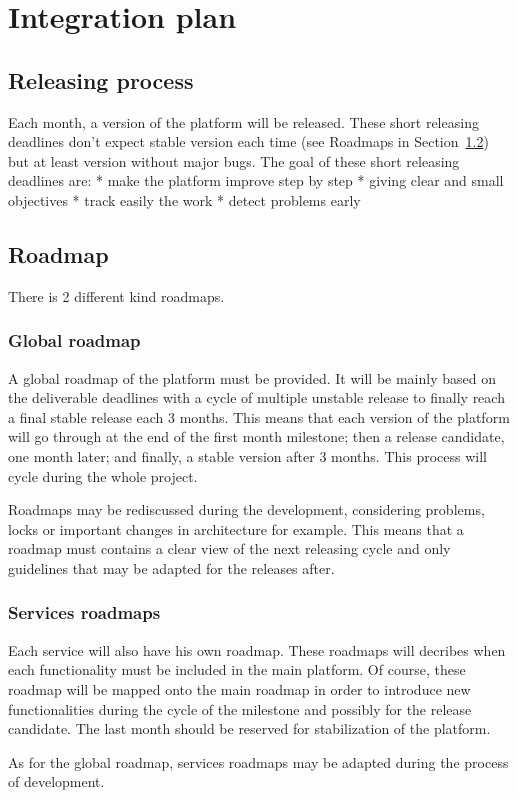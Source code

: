 \chapter{Integration plan}
\label{ch:integration-plan}

\section{Releasing process}
\label{sec:releasing-process}

Each month, a version of the platform will be released.
These short releasing deadlines don't expect stable version each time (see Roadmaps in
Section~\ref{sec:roadmap}) but at least version without major bugs.
The goal of these short releasing deadlines are:
* make the platform improve step by step
* giving clear and small objectives
* track easily the work
* detect problems early

\section{Roadmap}
\label{sec:roadmap}

There is 2 different kind roadmaps.
\subsection{Global roadmap}
\label{sec:global-roadmap}

A global roadmap of the platform must be provided.
It will be mainly based on the deliverable deadlines with a cycle of multiple unstable release to
finally reach a final stable release each 3 months.
This means that each version of the \learnpad platform will go through at the end of the first
month milestone; then a release candidate, one month later; and finally, a stable version after
3 months.
This process will cycle during the whole project.

Roadmaps may be rediscussed during the development, considering problems, locks or important
changes in architecture for example.
This means that a roadmap must contains a clear view of the next releasing cycle and only
guidelines that may be adapted for the releases after.

\subsection{Services roadmaps}
\label{sec:services-roadmaps}

Each service will also have his own roadmap.
These roadmaps will decribes when each functionality must be included in the main \learnpad
platform. Of course, these roadmap will be mapped onto the main roadmap in order to introduce new
functionalities during the cycle of the milestone and possibly for the release candidate.
The last month should be reserved for stabilization of the platform.

As for the global roadmap, services roadmaps may be adapted during the process of development.
